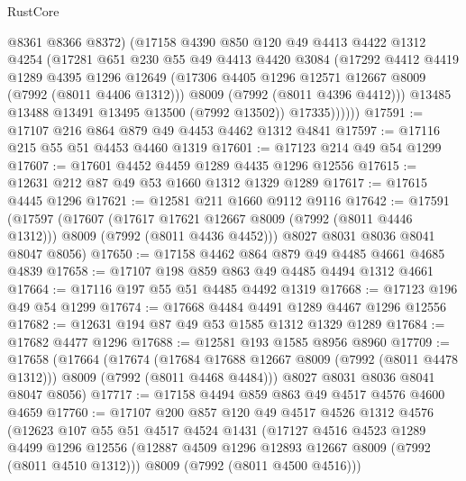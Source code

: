 \begin{lexlean}{RustCore}
\begin{coremodule}
                @8361
                @8366
                @8372)
              (@17158
                @4390
                @850
                @120
                @49
                @4413
                @4422
                @1312
                @4254
                (@17281
                  @651
                  @230
                  @55
                  @49
                  @4413
                  @4420
                  @3084
                  (@17292
                    @4412
                    @4419
                    @1289
                    @4395
                    @1296
                    @12649
                    (@17306 @4405 @1296 @12571 @12667 @8009 (@7992 (@8011 @4406 @1312)))
                    @8009
                    (@7992 (@8011 @4396 @4412)))
                  @13485
                  @13488
                  @13491
                  @13495
                  @13500
                  (@7992 @13502))
                @17335))))))
@17591 := @17107 @216 @864 @879 @49 @4453 @4462 @1312 @4841
@17597 := @17116 @215 @55 @51 @4453 @4460 @1319
@17601 := @17123 @214 @49 @54 @1299
@17607 := @17601 @4452 @4459 @1289 @4435 @1296 @12556
@17615 := @12631 @212 @87 @49 @53 @1660 @1312 @1329 @1289
@17617 := @17615 @4445 @1296
@17621 := @12581 @211 @1660 @9112 @9116
@17642 := @17591
    (@17597
      (@17607
        (@17617 @17621 @12667 @8009 (@7992 (@8011 @4446 @1312)))
        @8009
        (@7992 (@8011 @4436 @4452)))
      @8027
      @8031
      @8036
      @8041
      @8047
      @8056)
@17650 := @17158 @4462 @864 @879 @49 @4485 @4661 @4685 @4839
@17658 := @17107 @198 @859 @863 @49 @4485 @4494 @1312 @4661
@17664 := @17116 @197 @55 @51 @4485 @4492 @1319
@17668 := @17123 @196 @49 @54 @1299
@17674 := @17668 @4484 @4491 @1289 @4467 @1296 @12556
@17682 := @12631 @194 @87 @49 @53 @1585 @1312 @1329 @1289
@17684 := @17682 @4477 @1296
@17688 := @12581 @193 @1585 @8956 @8960
@17709 := @17658
    (@17664
      (@17674
        (@17684 @17688 @12667 @8009 (@7992 (@8011 @4478 @1312)))
        @8009
        (@7992 (@8011 @4468 @4484)))
      @8027
      @8031
      @8036
      @8041
      @8047
      @8056)
@17717 := @17158 @4494 @859 @863 @49 @4517 @4576 @4600 @4659
@17760 := @17107
    @200
    @857
    @120
    @49
    @4517
    @4526
    @1312
    @4576
    (@12623
      @107
      @55
      @51
      @4517
      @4524
      @1431
      (@17127
        @4516
        @4523
        @1289
        @4499
        @1296
        @12556
        (@12887 @4509 @1296 @12893 @12667 @8009 (@7992 (@8011 @4510 @1312)))
        @8009
        (@7992 (@8011 @4500 @4516)))

\end{coremodule}
\end{lexlean}
